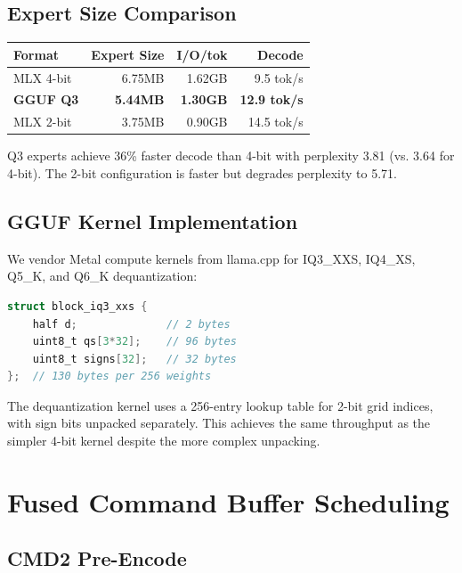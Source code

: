 \documentclass[11pt,twocolumn]{article}
\begin{document}
\subsection{Expert Size Comparison}

\begin{center}
\begin{tabular}{lrrr}
\toprule
\textbf{Format} & \textbf{Expert Size} & \textbf{I/O/tok} & \textbf{Decode} \\
\midrule
MLX 4-bit & 6.75MB & 1.62GB & 9.5 tok/s \\
\textbf{GGUF Q3} & \textbf{5.44MB} & \textbf{1.30GB} & \textbf{12.9 tok/s} \\
MLX 2-bit & 3.75MB & 0.90GB & 14.5 tok/s \\
\bottomrule
\end{tabular}
\end{center}

Q3 experts achieve 36\% faster decode than 4-bit with perplexity 3.81 (vs. 3.64 for 4-bit). The 2-bit configuration is faster but degrades perplexity to 5.71.

\subsection{GGUF Kernel Implementation}

We vendor Metal compute kernels from llama.cpp for IQ3\_XXS, IQ4\_XS, Q5\_K, and Q6\_K dequantization:

\vspace{1em}
\begin{lstlisting}[language=C,caption=IQ3\_XXS block layout (256 weights),numbers=none]
struct block_iq3_xxs {
    half d;              // 2 bytes
    uint8_t qs[3*32];    // 96 bytes
    uint8_t signs[32];   // 32 bytes
};  // 130 bytes per 256 weights
\end{lstlisting}

The dequantization kernel uses a 256-entry lookup table for 2-bit grid indices, with sign bits unpacked separately. This achieves the same throughput as the simpler 4-bit kernel despite the more complex unpacking.

\section{Fused Command Buffer Scheduling}

\subsection{CMD2 Pre-Encode}
\end{document}
